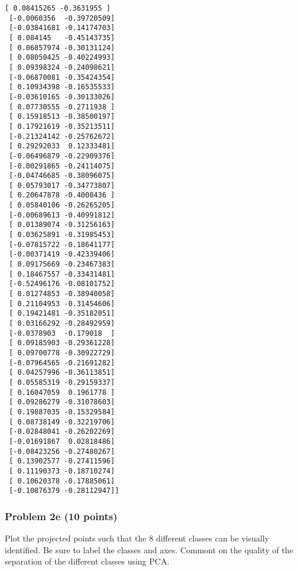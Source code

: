 \documentclass[11pt]{article}
\begin{document}
\begin{Verbatim}[commandchars=\\\{\}]
 [ 0.08415265 -0.3631955 ]
 [-0.0060356  -0.39720509]
 [-0.03841681 -0.14174703]
 [ 0.084145   -0.45143735]
 [ 0.06857974 -0.30131124]
 [ 0.08050425 -0.40224993]
 [ 0.09398324 -0.24098621]
 [-0.06870081 -0.35424354]
 [ 0.10934398 -0.16535533]
 [-0.03610165 -0.30133026]
 [ 0.07730555 -0.2711938 ]
 [ 0.15918513 -0.38500197]
 [ 0.17921619 -0.35213511]
 [-0.21324142 -0.25762672]
 [ 0.29292033  0.12333481]
 [-0.06496879 -0.22909376]
 [-0.00291865 -0.24114075]
 [-0.04746685 -0.38096075]
 [ 0.05793017 -0.34773807]
 [ 0.20647878 -0.4008436 ]
 [ 0.05840106 -0.26265205]
 [-0.00689613 -0.40991812]
 [ 0.01389074 -0.31256163]
 [ 0.03625891 -0.31985453]
 [-0.07815722 -0.18641177]
 [-0.00371419 -0.42339406]
 [ 0.09175669 -0.23467383]
 [ 0.18467557 -0.33431481]
 [-0.52496176 -0.08101752]
 [ 0.01274853 -0.38940058]
 [ 0.21104953 -0.31454606]
 [ 0.19421481 -0.35182051]
 [ 0.03166292 -0.28492959]
 [-0.0378903  -0.179018  ]
 [ 0.09185903 -0.29361228]
 [ 0.09700778 -0.30922729]
 [-0.07964565 -0.21691282]
 [ 0.04257996 -0.36113851]
 [ 0.05585319 -0.29159337]
 [ 0.16047059  0.1961778 ]
 [ 0.09286279 -0.31078603]
 [ 0.19887035 -0.15329584]
 [ 0.08738149 -0.32219706]
 [-0.02848041 -0.26202269]
 [-0.01691867  0.02818486]
 [-0.08423256 -0.27480267]
 [ 0.13902577 -0.27411596]
 [ 0.11190373 -0.18710274]
 [ 0.10620378 -0.17885061]
 [-0.10876379 -0.28112947]]

    \end{Verbatim}

    \subsubsection{Problem 2e (10 points)}\label{problem-2e-10-points}

Plot the projected points such that the 8 different classes can be
visually identified. Be sure to label the classes and axes. Commont on
the quality of the separation of the different classes using PCA.
\end{document}
